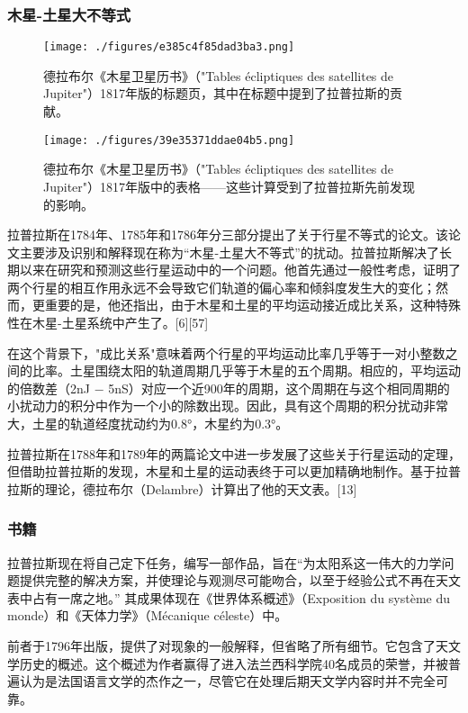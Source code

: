 \subsubsection{木星-土星大不等式}
\begin{figure}[ht]
\centering
\texttt{[image: ./figures/e385c4f85dad3ba3.png]}
\caption{德拉布尔《木星卫星历书》（"Tables écliptiques des satellites de Jupiter"）1817年版的标题页，其中在标题中提到了拉普拉斯的贡献。} \label{fig_LPLS_7}
\end{figure}
\begin{figure}[ht]
\centering
\texttt{[image: ./figures/39e35371ddae04b5.png]}
\caption{德拉布尔《木星卫星历书》（"Tables écliptiques des satellites de Jupiter"）1817年版中的表格——这些计算受到了拉普拉斯先前发现的影响。} \label{fig_LPLS_8}
\end{figure}
拉普拉斯在1784年、1785年和1786年分三部分提出了关于行星不等式的论文。该论文主要涉及识别和解释现在称为“木星-土星大不等式”的扰动。拉普拉斯解决了长期以来在研究和预测这些行星运动中的一个问题。他首先通过一般性考虑，证明了两个行星的相互作用永远不会导致它们轨道的偏心率和倾斜度发生大的变化；然而，更重要的是，他还指出，由于木星和土星的平均运动接近成比关系，这种特殊性在木星-土星系统中产生了。[6][57]

在这个背景下，"成比关系"意味着两个行星的平均运动比率几乎等于一对小整数之间的比率。土星围绕太阳的轨道周期几乎等于木星的五个周期。相应的，平均运动的倍数差（2nJ − 5nS）对应一个近900年的周期，这个周期在与这个相同周期的小扰动力的积分中作为一个小的除数出现。因此，具有这个周期的积分扰动非常大，土星的轨道经度扰动约为0.8°，木星约为0.3°。

拉普拉斯在1788年和1789年的两篇论文中进一步发展了这些关于行星运动的定理，但借助拉普拉斯的发现，木星和土星的运动表终于可以更加精确地制作。基于拉普拉斯的理论，德拉布尔（Delambre）计算出了他的天文表。[13]
\subsubsection{书籍}
拉普拉斯现在将自己定下任务，编写一部作品，旨在“为太阳系这一伟大的力学问题提供完整的解决方案，并使理论与观测尽可能吻合，以至于经验公式不再在天文表中占有一席之地。” 其成果体现在《世界体系概述》（Exposition du système du monde）和《天体力学》（Mécanique céleste）中。

前者于1796年出版，提供了对现象的一般解释，但省略了所有细节。它包含了天文学历史的概述。这个概述为作者赢得了进入法兰西科学院40名成员的荣誉，并被普遍认为是法国语言文学的杰作之一，尽管它在处理后期天文学内容时并不完全可靠。

